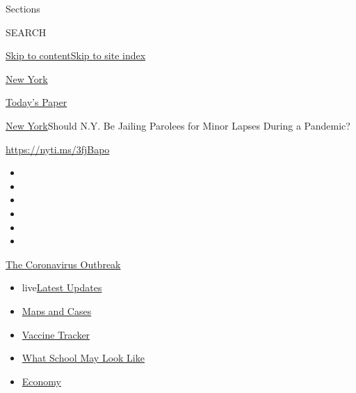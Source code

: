 Sections

SEARCH

\protect\hyperlink{site-content}{Skip to
content}\protect\hyperlink{site-index}{Skip to site index}

\href{https://www.nytimes.com/section/nyregion}{New York}

\href{https://myaccount.nytimes.com/auth/login?response_type=cookie\&client_id=vi}{}

\href{https://www.nytimes.com/section/todayspaper}{Today's Paper}

\href{/section/nyregion}{New York}\textbar{}Should N.Y. Be Jailing
Parolees for Minor Lapses During a Pandemic?

\url{https://nyti.ms/3fjBapo}

\begin{itemize}
\item
\item
\item
\item
\item
\item
\end{itemize}

\href{https://www.nytimes.com/news-event/coronavirus?action=click\&pgtype=Article\&state=default\&region=TOP_BANNER\&context=storylines_menu}{The
Coronavirus Outbreak}

\begin{itemize}
\tightlist
\item
  live\href{https://www.nytimes.com/2020/08/01/world/coronavirus-covid-19.html?action=click\&pgtype=Article\&state=default\&region=TOP_BANNER\&context=storylines_menu}{Latest
  Updates}
\item
  \href{https://www.nytimes.com/interactive/2020/us/coronavirus-us-cases.html?action=click\&pgtype=Article\&state=default\&region=TOP_BANNER\&context=storylines_menu}{Maps
  and Cases}
\item
  \href{https://www.nytimes.com/interactive/2020/science/coronavirus-vaccine-tracker.html?action=click\&pgtype=Article\&state=default\&region=TOP_BANNER\&context=storylines_menu}{Vaccine
  Tracker}
\item
  \href{https://www.nytimes.com/interactive/2020/07/29/us/schools-reopening-coronavirus.html?action=click\&pgtype=Article\&state=default\&region=TOP_BANNER\&context=storylines_menu}{What
  School May Look Like}
\item
  \href{https://www.nytimes.com/live/2020/07/31/business/stock-market-today-coronavirus?action=click\&pgtype=Article\&state=default\&region=TOP_BANNER\&context=storylines_menu}{Economy}
\end{itemize}

